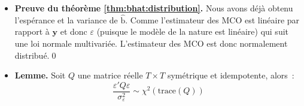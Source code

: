 \documentclass[10pt]{beamer}
\theoremstyle{plain}
\begin{document}
\begin{notes}

  \begin{itemize}

  \item \textbf{Preuve du théorème \ref{thm:bhat:distribution}.} Nous avons déjà obtenu l'espérance et la variance de $\hat{\mathrm b}$. Comme l'estimateur des MCO est linéaire par rapport à $\mathbf y$ et donc $\varepsilon$ (puisque le modèle de la nature est linéaire) qui suit une loi normale multivariée. L'estimateur des MCO est donc normalement distribué.\qed\newline

  \item \textbf{Lemme.} Soit $Q$ une matrice réelle $T\times T$ symétrique et idempotente, alors~:
       \[
         \frac{\varepsilon' Q \varepsilon}{\sigma_{\varepsilon}^2} \sim \chi^2\left(\mathrm{trace}(Q)\right)
       \]
       \medskip


\end{itemize}
\end{notes}
\end{document}

